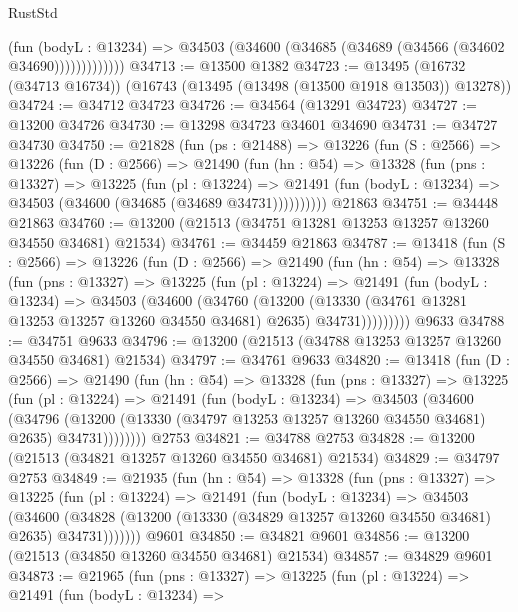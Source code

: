 \begin{lexlean}{RustStd}
\begin{coremodule}
                  (fun (bodyL : @13234) =>
                  @34503 (@34600 (@34685 (@34689 (@34566 (@34602 @34690)))))))))))))
@34713 := @13500 @1382
@34723 := @13495 (@16732 (@34713 @16734)) (@16743 (@13495 (@13498 (@13500 @1918 @13503)) @13278))
@34724 := @34712 @34723
@34726 := @34564 (@13291 @34723)
@34727 := @13200 @34726
@34730 := @13298 @34723 @34601 @34690
@34731 := @34727 @34730
@34750 := @21828
    (fun (ps : @21488) =>
    @13226
      (fun (S : @2566) =>
      @13226
        (fun (D : @2566) =>
        @21490
          (fun (hn : @54) =>
          @13328
            (fun (pns : @13327) =>
            @13225
              (fun (pl : @13224) =>
              @21491 (fun (bodyL : @13234) => @34503 (@34600 (@34685 (@34689 @34731))))))))))
    @21863
@34751 := @34448 @21863
@34760 := @13200 (@21513 (@34751 @13281 @13253 @13257 @13260 @34550 @34681) @21534)
@34761 := @34459 @21863
@34787 := @13418
    (fun (S : @2566) =>
    @13226
      (fun (D : @2566) =>
      @21490
        (fun (hn : @54) =>
        @13328
          (fun (pns : @13327) =>
          @13225
            (fun (pl : @13224) =>
            @21491
              (fun (bodyL : @13234) =>
              @34503
                (@34600
                  (@34760
                    (@13200
                      (@13330 (@34761 @13281 @13253 @13257 @13260 @34550 @34681) @2635)
                      @34731)))))))))
    @9633
@34788 := @34751 @9633
@34796 := @13200 (@21513 (@34788 @13253 @13257 @13260 @34550 @34681) @21534)
@34797 := @34761 @9633
@34820 := @13418
    (fun (D : @2566) =>
    @21490
      (fun (hn : @54) =>
      @13328
        (fun (pns : @13327) =>
        @13225
          (fun (pl : @13224) =>
          @21491
            (fun (bodyL : @13234) =>
            @34503
              (@34600
                (@34796
                  (@13200 (@13330 (@34797 @13253 @13257 @13260 @34550 @34681) @2635) @34731))))))))
    @2753
@34821 := @34788 @2753
@34828 := @13200 (@21513 (@34821 @13257 @13260 @34550 @34681) @21534)
@34829 := @34797 @2753
@34849 := @21935
    (fun (hn : @54) =>
    @13328
      (fun (pns : @13327) =>
      @13225
        (fun (pl : @13224) =>
        @21491
          (fun (bodyL : @13234) =>
          @34503
            (@34600
              (@34828 (@13200 (@13330 (@34829 @13257 @13260 @34550 @34681) @2635) @34731)))))))
    @9601
@34850 := @34821 @9601
@34856 := @13200 (@21513 (@34850 @13260 @34550 @34681) @21534)
@34857 := @34829 @9601
@34873 := @21965
    (fun (pns : @13327) =>
    @13225
      (fun (pl : @13224) =>
      @21491
        (fun (bodyL : @13234) =>

\end{coremodule}
\end{lexlean}
